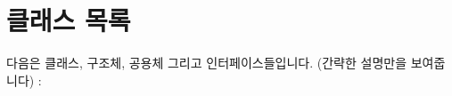 \section{클래스 목록}
다음은 클래스, 구조체, 공용체 그리고 인터페이스들입니다. (간략한 설명만을 보여줍니다) :\begin{DoxyCompactList}
\item{}
\end{DoxyCompactList}
